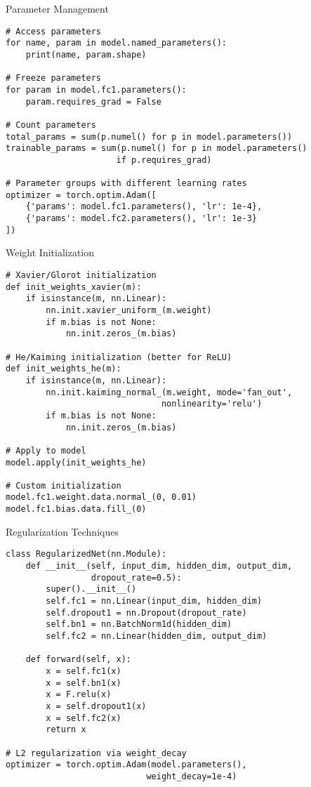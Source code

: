 \documentclass[aspectratio=169,10pt]{beamer}
\begin{document}
\begin{frame}[fragile]{Parameter Management}
\begin{lstlisting}
# Access parameters
for name, param in model.named_parameters():
    print(name, param.shape)

# Freeze parameters
for param in model.fc1.parameters():
    param.requires_grad = False

# Count parameters
total_params = sum(p.numel() for p in model.parameters())
trainable_params = sum(p.numel() for p in model.parameters() 
                      if p.requires_grad)

# Parameter groups with different learning rates
optimizer = torch.optim.Adam([
    {'params': model.fc1.parameters(), 'lr': 1e-4},
    {'params': model.fc2.parameters(), 'lr': 1e-3}
])
\end{lstlisting}
\end{frame}

\begin{frame}[fragile]{Weight Initialization}
\begin{lstlisting}
# Xavier/Glorot initialization
def init_weights_xavier(m):
    if isinstance(m, nn.Linear):
        nn.init.xavier_uniform_(m.weight)
        if m.bias is not None:
            nn.init.zeros_(m.bias)

# He/Kaiming initialization (better for ReLU)
def init_weights_he(m):
    if isinstance(m, nn.Linear):
        nn.init.kaiming_normal_(m.weight, mode='fan_out',
                               nonlinearity='relu')
        if m.bias is not None:
            nn.init.zeros_(m.bias)

# Apply to model
model.apply(init_weights_he)

# Custom initialization
model.fc1.weight.data.normal_(0, 0.01)
model.fc1.bias.data.fill_(0)
\end{lstlisting}
\end{frame}

\begin{frame}[fragile]{Regularization Techniques}
\begin{lstlisting}
class RegularizedNet(nn.Module):
    def __init__(self, input_dim, hidden_dim, output_dim,
                 dropout_rate=0.5):
        super().__init__()
        self.fc1 = nn.Linear(input_dim, hidden_dim)
        self.dropout1 = nn.Dropout(dropout_rate)
        self.bn1 = nn.BatchNorm1d(hidden_dim)
        self.fc2 = nn.Linear(hidden_dim, output_dim)
        
    def forward(self, x):
        x = self.fc1(x)
        x = self.bn1(x)
        x = F.relu(x)
        x = self.dropout1(x)
        x = self.fc2(x)
        return x

# L2 regularization via weight_decay
optimizer = torch.optim.Adam(model.parameters(),
                            weight_decay=1e-4)
\end{lstlisting}
\end{frame}
\end{document}
